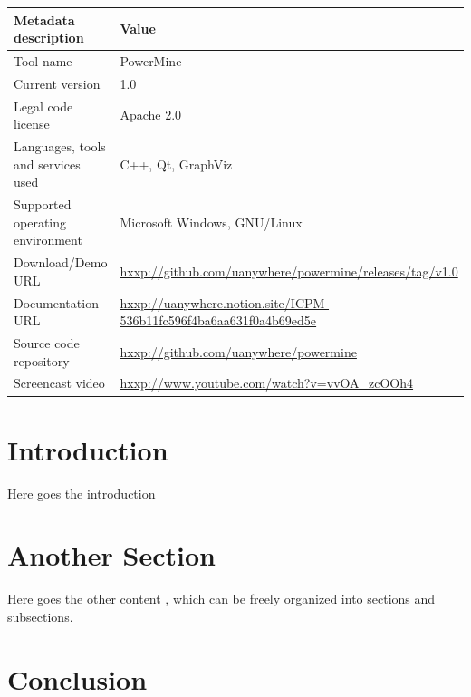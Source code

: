 \documentclass[
]{ceurart}
\begin{document}
\begin{table}[h]
\footnotesize
\begin{tabular}{ll}
\toprule
Metadata description               & Value \\
\midrule
Tool name                          & PowerMine \\
Current version                    & 1.0 \\
Legal code license                 & Apache 2.0 \\
Languages, tools and services used & C++, Qt, GraphViz \\
Supported operating environment    & Microsoft Windows, GNU/Linux  \\
Download/Demo URL                  & \url{hxxp://github.com/uanywhere/powermine/releases/tag/v1.0}  \\
Documentation URL                  & \url{hxxp://uanywhere.notion.site/ICPM-536b11fc596f4ba6aa631f0a4b69ed5e} \\
Source code repository             & \url{hxxp://github.com/uanywhere/powermine} \\
Screencast video                   & \url{hxxp://www.youtube.com/watch?v=vvOA\_zcOOh4} \\
\bottomrule
\end{tabular}
\end{table}

\section{Introduction}

Here goes the introduction

\section{Another Section}

Here goes the other content \cite{katz2009research}, which can be freely organized into sections and subsections.

\section{Conclusion}
\end{document}
